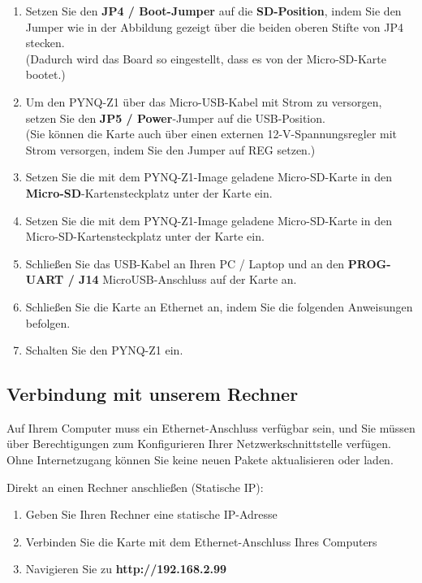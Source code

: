 \documentclass[a4paper]{report}
\begin{document}
	\begin{enumerate} 
		\item Setzen Sie den \textbf{JP4 / Boot-Jumper} auf die \textbf{SD-Position}, indem Sie den Jumper wie in der Abbildung gezeigt über die beiden oberen Stifte von JP4 stecken.\\
		 (Dadurch wird das Board so eingestellt, dass es von der Micro-SD-Karte bootet.)

		\item Um den PYNQ-Z1 über das Micro-USB-Kabel mit Strom zu versorgen, setzen Sie den \textbf{ JP5 / Power}-Jumper auf die USB-Position.\\
(Sie können die Karte auch über einen externen 12-V-Spannungsregler mit Strom versorgen, indem Sie den Jumper auf REG setzen.)

		\item Setzen Sie die mit dem PYNQ-Z1-Image geladene Micro-SD-Karte in den \textbf{Micro-SD}-Kartensteckplatz unter der Karte ein.

		\item Setzen Sie die mit dem PYNQ-Z1-Image geladene Micro-SD-Karte in den Micro-SD-Kartensteckplatz unter der Karte ein.

		\item Schließen Sie das USB-Kabel an Ihren PC / Laptop und an den \textbf{PROG-UART / J14} MicroUSB-Anschluss auf der Karte an.

		\item Schließen Sie die Karte an Ethernet an, indem Sie die folgenden Anweisungen befolgen.

		\item Schalten Sie den PYNQ-Z1 ein.

	\end{enumerate}



\subsection{Verbindung mit unserem Rechner}
Auf Ihrem Computer muss ein Ethernet-Anschluss verfügbar sein, und Sie müssen über Berechtigungen zum Konfigurieren Ihrer Netzwerkschnittstelle verfügen. Ohne Internetzugang können Sie keine neuen Pakete aktualisieren oder laden.

	Direkt an einen Rechner anschließen (Statische IP):
		\begin{enumerate} 
		\item Geben Sie Ihren Rechner eine statische IP-Adresse
		\item Verbinden Sie die Karte mit dem Ethernet-Anschluss Ihres Computers
		\item Navigieren Sie zu \textbf{http://192.168.2.99}
		\end{enumerate}
 
\end{document}
